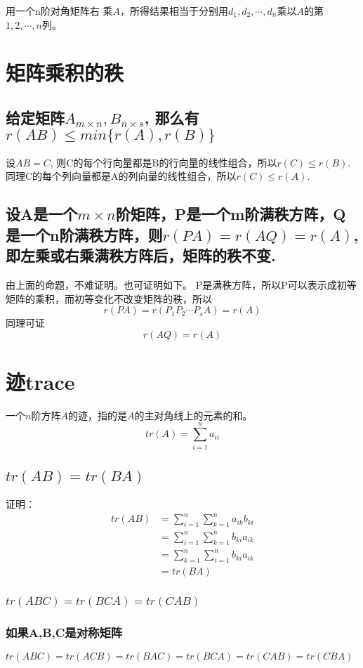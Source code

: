 \documentclass[]{article}
\begin{document}
用一个n阶对角矩阵右
乘$ A $，所得结果相当于分别用$ d_1, d_2, \cdots, d_n $乘以$ A $的第$ 1,2,\cdots,n $列。

\section{矩阵乘积的秩}
\subsection{给定矩阵$ A_{m\times n}, B_{n\times s} $, 那么有$r(AB)\leq min\{r(A),r(B)\}$}
设$ AB=C $, 则C的每个行向量都是B的行向量的线性组合，所以$ r(C)\leq r(B) $. 同理C的每个列向量都是A的列向量的线性组合，所以$ r(C)\leq r(A) $.
\subsection{设A是一个$ m\times n $阶矩阵，P是一个m阶满秩方阵，Q是一个n阶满秩方阵，则$ r(PA)=r(AQ)=r(A)$, 即左乘或右乘满秩方阵后，矩阵的秩不变.}
由上面的命题，不难证明。也可证明如下。
P是满秩方阵，所以P可以表示成初等矩阵的乘积，而初等变化不改变矩阵的秩，所以
\[ 
r(PA) = r(P_1P_2\cdots P_sA) = r(A)
 \]
同理可证\[ r(AQ) = r(A) \]

\section{迹trace}
一个$ n $阶方阵$ A $的迹，指的是$ A $的主对角线上的元素的和。
\[
tr(A)=\sum_{i=1}^n a_{ii}
\]
\subsection{$ tr(AB)=tr(BA) $}
证明：
\[ 
\begin{aligned}
tr(AB) &= \sum_{i=1}^n\sum_{k=1}^n a_{ik}b_{ki} \\
	   &= \sum_{i=1}^n\sum_{k=1}^n b_{ki}a_{ik} \\
	   &= \sum_{k=1}^n\sum_{i=1}^n b_{ki}a_{ik} \\
	   &= tr(BA)
\end{aligned}
 \]

\subsubsection{$ tr(ABC) = tr(BCA) = tr(CAB) $}

\subsubsection{如果A,B,C是对称矩阵}
$
tr(ABC)=tr(ACB)=tr(BAC)=tr(BCA)=tr(CAB)=tr(CBA)
$
\end{document}
